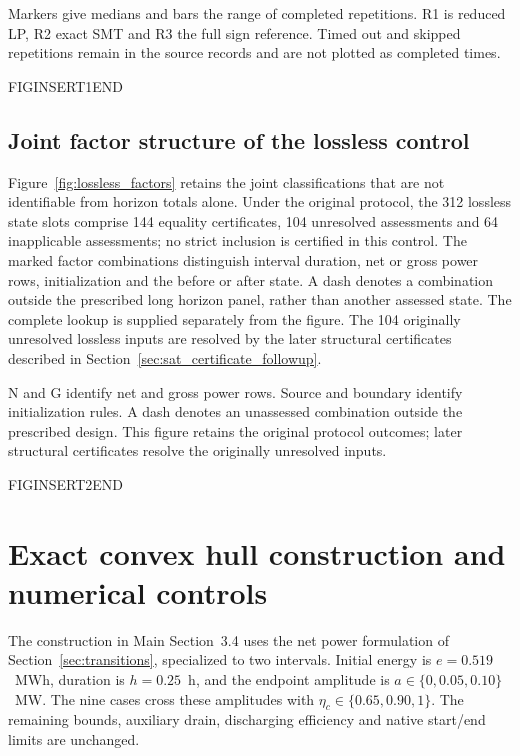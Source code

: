 Markers give medians and bars the range of completed repetitions. R1 is reduced LP, R2 exact SMT and R3 the full sign reference. Timed out and skipped repetitions remain in the source records and are not plotted as completed times.

FIGINSERT1END



\subsection{Joint factor structure of the lossless control}
Figure~\ref{fig:lossless_factors} retains the joint classifications that are
not identifiable from horizon totals alone. Under the original protocol, the 312 lossless state slots
comprise 144 equality certificates, 104 unresolved assessments and 64
inapplicable assessments; no strict inclusion is certified in this control.
The marked factor combinations distinguish interval duration, net or gross
power rows, initialization and the before or after state. A dash denotes a
combination outside the prescribed long horizon panel, rather than another
assessed state. The complete lookup is supplied separately from the figure. The 104 originally unresolved lossless inputs are resolved by the later structural certificates described in Section~\ref{sec:sat_certificate_followup}.


N and G identify net and gross power rows. Source and boundary identify initialization rules. A dash denotes an unassessed combination outside the prescribed design. This figure retains the original protocol outcomes; later structural certificates resolve the originally unresolved inputs.

FIGINSERT2END



\section{Exact convex hull construction and numerical controls}\label{sec:hull}
The construction in Main Section~3.4 uses the net power formulation of
Section~\ref{sec:transitions}, specialized to two intervals. Initial energy
is $e=0.519$~MWh, duration is $h=0.25$~h, and the endpoint amplitude is
$a\in\{0,0.05,0.10\}$~MW. The nine cases cross these amplitudes with
$\eta_c\in\{0.65,0.90,1\}$. The remaining bounds, auxiliary drain,
discharging efficiency and native start/end limits are unchanged.

